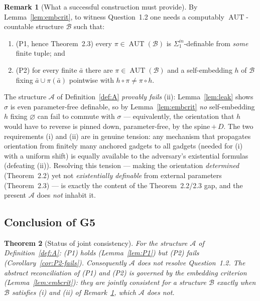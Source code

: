 \documentclass[12pt,fullpage]{article}
\newtheorem{theorem}{Theorem}[section]
\theoremstyle{definition}
\newtheorem{remark}[theorem]{Remark}
\newcommand{\A}{\mathcal{A}}
\newcommand{\B}{\mathcal{B}}
\newcommand{\AUT}{\operatorname{AUT}}
\begin{document}
\begin{remark}[What a successful construction must provide]\label{rem:spec}
By Lemma~\ref{lem:embcrit}, to witness Question~1.2 one needs a computably
$\AUT$-countable structure $\B$ such that:
\begin{enumerate}[label=(\roman*)]
\item (P1, hence Theorem~2.3) every $\pi\in\AUT(\B)$ is
  $\Sigma^{in}_1$-definable from \emph{some} finite tuple; and
\item (P2) for every finite $\bar a$ there are $\pi\in\AUT(\B)$ and a
  self-embedding $h$ of $\B$ fixing $\bar a\cup\pi(\bar a)$ pointwise with
  $h\circ\pi\neq\pi\circ h$.
\end{enumerate}
The structure $\A$ of Definition~\ref{def:A} \emph{provably fails} (ii):
Lemma~\ref{lem:leak} shows $\sigma$ is even parameter-free definable, so by
Lemma~\ref{lem:embcrit} \emph{no} self-embedding $h$ fixing $\varnothing$ can
fail to commute with $\sigma$ --- equivalently, the orientation that $h$ would
have to reverse is pinned down, parameter-free, by the spine\,$+$\,$D$.  The
two requirements (i) and (ii) are in genuine tension: any mechanism that
propagates orientation from finitely many anchored gadgets to all gadgets
(needed for (i) with a uniform shift) is equally available to the adversary's
existential formulas (defeating (ii)).  Resolving this tension --- making the
orientation \emph{determined} (Theorem~2.2) yet not \emph{existentially
definable} from external parameters (Theorem~2.3) --- is exactly the content of
the Theorem~2.2/2.3 gap, and the present $\A$ does \emph{not} inhabit it.
\end{remark}

\subsection*{Conclusion of G5}

\begin{theorem}[Status of joint consistency]\label{thm:G5}
For the structure $\A$ of Definition~\ref{def:A}: (P1) holds
(Lemma~\ref{lem:P1}) but (P2) \emph{fails} (Corollary~\ref{cor:P2-fails}).
Consequently $\A$ does not resolve Question~1.2.  The abstract reconciliation
of (P1) and (P2) is governed by the embedding criterion
(Lemma~\ref{lem:embcrit}): they are jointly consistent for a structure $\B$
exactly when $\B$ satisfies (i) and (ii) of Remark~\ref{rem:spec}, which $\A$
does not.
\end{theorem}
\end{document}

